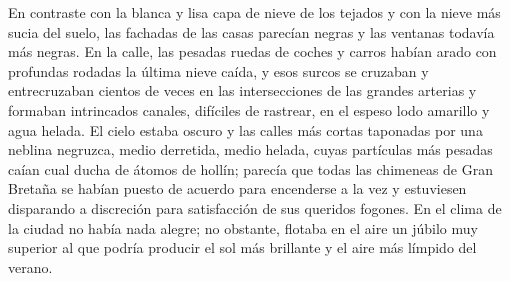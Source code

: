 \documentclass{novela}
\begin{document}
 En contraste con la blanca y lisa capa de nieve de los tejados y con la nieve más sucia del suelo, las fachadas de las casas parecían negras y las ventanas todavía más negras. En la calle, las pesadas ruedas de coches y carros habían arado con profundas rodadas la última nieve caída, y esos surcos se cruzaban y entrecruzaban cientos de veces en las intersecciones de las grandes arterias y formaban intrincados canales, difíciles de rastrear, en el espeso lodo amarillo y agua helada. El cielo estaba oscuro y las calles más cortas taponadas por una neblina negruzca, medio derretida, medio helada, cuyas partículas más pesadas caían cual ducha de átomos de hollín; parecía que todas las chimeneas de Gran Bretaña se habían puesto de acuerdo para encenderse a la vez y estuviesen disparando a discreción para satisfacción de sus queridos fogones. En el clima de la ciudad no había nada alegre; no obstante, flotaba en el aire un júbilo muy superior al que podría producir el sol más brillante y el aire más límpido del verano.
\end{document}
